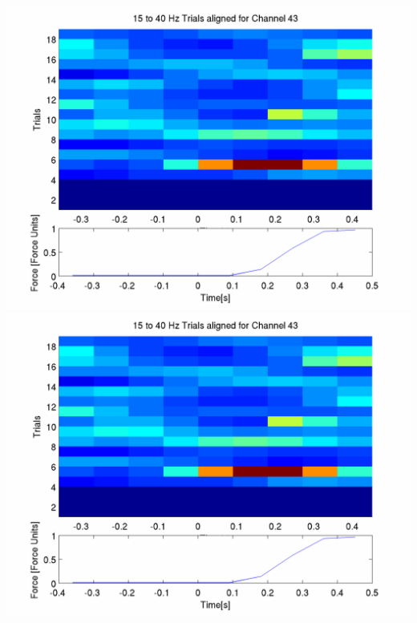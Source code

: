 \documentclass[12pt]{article}
\begin{document}
\includegraphics[scale=0.2]{noCAR/plot_5_aligned_trials.png}
\includegraphics[scale=0.2]{WithCAR/plot_5_aligned_trials.png}
\end{document}

